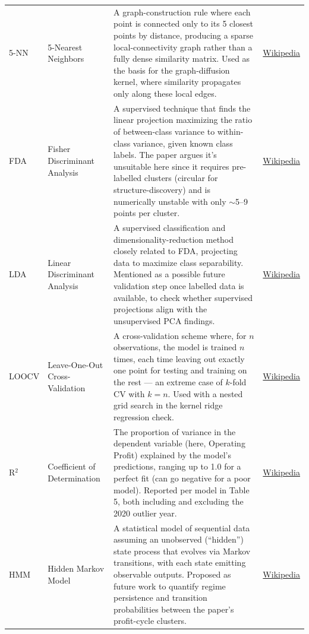 \documentclass[10pt]{article}
\begin{document}
\begin{longtable}{P{2cm} P{3cm} P{9cm} P{2cm}}
5-NN & 5-Nearest Neighbors &
A graph-construction rule where each point is connected only to its 5 closest points by distance, producing a sparse local-connectivity graph rather than a fully dense similarity matrix. Used as the basis for the graph-diffusion kernel, where similarity propagates only along these local edges. &
\href{https://en.wikipedia.org/wiki/K-nearest_neighbors_algorithm}{Wikipedia} \\

FDA & Fisher Discriminant Analysis &
A supervised technique that finds the linear projection maximizing the ratio of between-class variance to within-class variance, given known class labels. The paper argues it's unsuitable here since it requires pre-labelled clusters (circular for structure-discovery) and is numerically unstable with only $\sim$5--9 points per cluster. &
\href{https://en.wikipedia.org/wiki/Linear_discriminant_analysis#Fisher's_linear_discriminant}{Wikipedia} \\

LDA & Linear Discriminant Analysis &
A supervised classification and dimensionality-reduction method closely related to FDA, projecting data to maximize class separability. Mentioned as a possible future validation step once labelled data is available, to check whether supervised projections align with the unsupervised PCA findings. &
\href{https://en.wikipedia.org/wiki/Linear_discriminant_analysis}{Wikipedia} \\

LOOCV & Leave-One-Out Cross-Validation &
A cross-validation scheme where, for $n$ observations, the model is trained $n$ times, each time leaving out exactly one point for testing and training on the rest --- an extreme case of $k$-fold CV with $k=n$. Used with a nested grid search in the kernel ridge regression check. &
\href{https://en.wikipedia.org/wiki/Cross-validation_(statistics)#Leave-one-out_cross-validation}{Wikipedia} \\

R$^2$ & Coefficient of Determination &
The proportion of variance in the dependent variable (here, Operating Profit) explained by the model's predictions, ranging up to 1.0 for a perfect fit (can go negative for a poor model). Reported per model in Table 5, both including and excluding the 2020 outlier year. &
\href{https://en.wikipedia.org/wiki/Coefficient_of_determination}{Wikipedia} \\

HMM & Hidden Markov Model &
A statistical model of sequential data assuming an unobserved (``hidden'') state process that evolves via Markov transitions, with each state emitting observable outputs. Proposed as future work to quantify regime persistence and transition probabilities between the paper's profit-cycle clusters. &
\href{https://en.wikipedia.org/wiki/Hidden_Markov_model}{Wikipedia} \\


\end{longtable}
\end{document}
